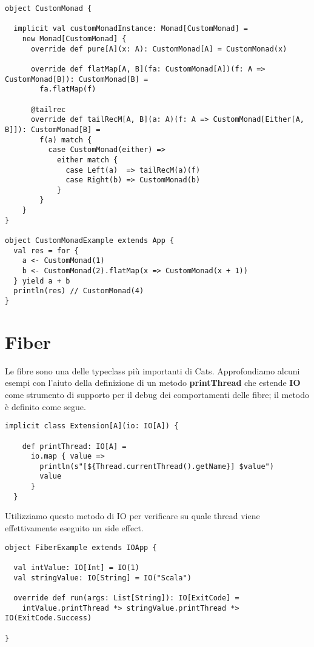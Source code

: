 \begin{verbatim}
object CustomMonad {

  implicit val customMonadInstance: Monad[CustomMonad] =
    new Monad[CustomMonad] {
      override def pure[A](x: A): CustomMonad[A] = CustomMonad(x)

      override def flatMap[A, B](fa: CustomMonad[A])(f: A => CustomMonad[B]): CustomMonad[B] =
        fa.flatMap(f)

      @tailrec
      override def tailRecM[A, B](a: A)(f: A => CustomMonad[Either[A, B]]): CustomMonad[B] =
        f(a) match {
          case CustomMonad(either) =>
            either match {
              case Left(a)  => tailRecM(a)(f)
              case Right(b) => CustomMonad(b)
            }
        }
    }
}

object CustomMonadExample extends App {
  val res = for {
    a <- CustomMonad(1)
    b <- CustomMonad(2).flatMap(x => CustomMonad(x + 1))
  } yield a + b
  println(res) // CustomMonad(4)
}

\end{verbatim}

\section{Fiber}
Le fibre sono una delle typeclass più importanti di Cats. Approfondiamo alcuni esempi con l'aiuto della definizione di un metodo \textbf{printThread} che estende \textbf{IO} come strumento di supporto per il debug dei comportamenti delle fibre; il metodo è definito come segue.
\begin{verbatim}
implicit class Extension[A](io: IO[A]) {

    def printThread: IO[A] =
      io.map { value =>
        println(s"[${Thread.currentThread().getName}] $value")
        value
      }
  }
\end{verbatim}

Utilizziamo questo metodo di IO per verificare su quale thread viene effettivamente eseguito un side effect.
\begin{verbatim}
object FiberExample extends IOApp {

  val intValue: IO[Int] = IO(1)
  val stringValue: IO[String] = IO("Scala")

  override def run(args: List[String]): IO[ExitCode] =
    intValue.printThread *> stringValue.printThread *> IO(ExitCode.Success)
    
}

\end{verbatim}

